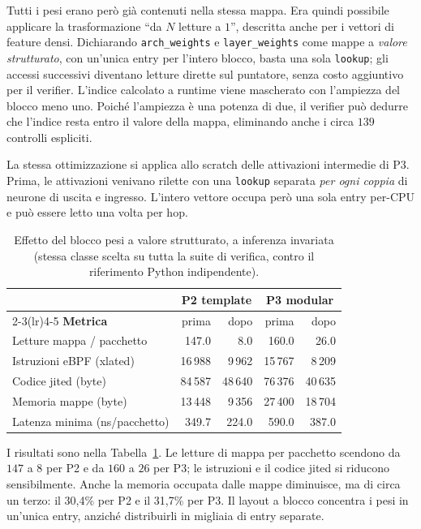 \documentclass[binding=0.6cm,italian,oneside,noexaminfo]{sapthesis}
\begin{document}
Tutti i pesi erano però già contenuti nella stessa mappa. Era quindi possibile applicare la trasformazione ``da $N$ letture a $1$'', descritta anche per i vettori di feature densi. Dichiarando \texttt{arch\_weights} e \texttt{layer\_weights} come mappe a \emph{valore strutturato}, con un'unica entry per l'intero blocco, basta una sola \texttt{lookup}; gli accessi successivi diventano letture dirette sul puntatore, senza costo aggiuntivo per il verifier. L'indice calcolato a runtime viene mascherato con l'ampiezza del blocco meno uno. Poiché l'ampiezza è una potenza di due, il verifier può dedurre che l'indice resta entro il valore della mappa, eliminando anche i circa $139$ controlli espliciti.

La stessa ottimizzazione si applica allo scratch delle attivazioni intermedie di P3. Prima, le attivazioni venivano rilette con una \texttt{lookup} separata \emph{per ogni coppia} di neurone di uscita e ingresso. L'intero vettore occupa però una sola entry per-CPU e può essere letto una volta per hop.

\begin{table}[h]
\centering
\caption{Effetto del blocco pesi a valore strutturato, a inferenza invariata (stessa classe scelta su tutta la suite di verifica, contro il riferimento Python indipendente).}
\label{tab:blocco-pesi}
\begin{tabular}{lrrrr}
\toprule
 & \multicolumn{2}{c}{\textbf{P2 template}} & \multicolumn{2}{c}{\textbf{P3 modular}} \\
\cmidrule(lr){2-3}\cmidrule(lr){4-5}
\textbf{Metrica} & prima & dopo & prima & dopo \\
\midrule
Letture mappa / pacchetto & 147.0 & 8.0 & 160.0 & 26.0 \\
Istruzioni eBPF (xlated) & 16\,988 & 9\,962 & 15\,767 & 8\,209 \\
Codice jited (byte) & 84\,587 & 48\,640 & 76\,376 & 40\,635 \\
Memoria mappe (byte) & 13\,448 & 9\,356 & 27\,400 & 18\,704 \\
Latenza minima (ns/pacchetto) & 349.7 & 224.0 & 590.0 & 387.0 \\
\bottomrule
\end{tabular}
\end{table}

I risultati sono nella Tabella~\ref{tab:blocco-pesi}. Le letture di mappa per pacchetto scendono da $147$ a $8$ per P2 e da $160$ a $26$ per P3; le istruzioni e il codice jited si riducono sensibilmente. Anche la memoria occupata dalle mappe diminuisce, ma di circa un terzo: il 30,4\% per P2 e il 31,7\% per P3. Il layout a blocco concentra i pesi in un'unica entry, anziché distribuirli in migliaia di entry separate.
\end{document}
